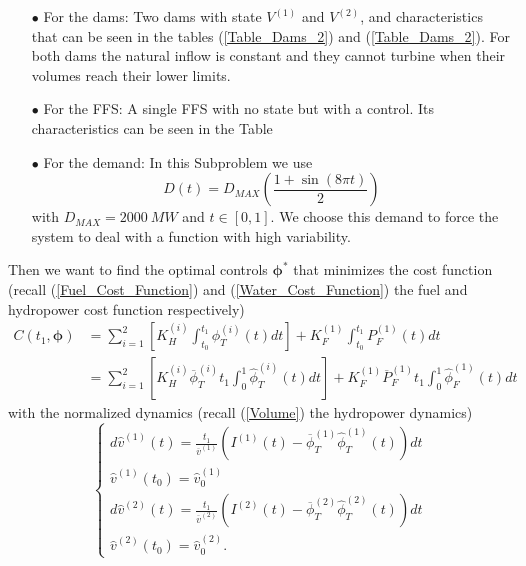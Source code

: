 \begin{enumerate}

\item[$\bullet$] For the dams: Two dams with state $V^{(1)}$ and $V^{(2)}$, and characteristics  that can be seen in the tables (\ref{Table_Dams_2}) and (\ref{Table_Dams_2}). For both dams the natural inflow is constant and they cannot turbine when their volumes reach their lower limits.

\item[$\bullet$] For the FFS: A single FFS with no state but with a control. Its characteristics can be seen in the Table 

\item[$\bullet$] For the demand: In this Subproblem we use
\begin{equation}
D(t)=D_{MAX}\left(\frac{1+\sin(8\pi t)}{2}\right)
\label{Demand_SSP}
\end{equation}
with $D_{MAX}=\SI{2000}{MW}$ and $t\in[0,1]$. We choose this demand to force the system to deal with a function with high variability.

\end{enumerate}
Then we want to find the optimal controls $\bm{\phi}^*$ that minimizes the cost function (recall (\ref{Fuel_Cost_Function}) and (\ref{Water_Cost_Function}) the fuel and hydropower cost function respectively)
\begin{equation}
\begin{split}
C(t_1,\bm{\phi})&=\sum_{i=1}^2\left[K_H^{(i)}\int_{t_0}^{t_1}\phi_T^{(i)}(t)dt\right]+K_F^{(1)}\int_{t_0}^{t_1}P_F^{(1)}(t)dt\\
&=\sum_{i=1}^2\left[K_H^{(i)}\overline{\phi}_T^{(i)}t_1\int_{0}^{1}\hat{\phi}_T^{(i)}(t)dt\right]+K_F^{(1)}\overline{P}_F^{(1)}t_1\int_{0}^{1}\hat{\phi}_F^{(1)}(t)dt
\end{split}
\end{equation}
with the normalized dynamics (recall (\ref{Volume}) the hydropower dynamics)
\begin{equation}
\begin{cases}
d\hat{v}^{(1)}(t)=\frac{t_1}{\overline{v}^{(1)}}\left(I^{(1)}(t)-\overline{\phi}_T^{(1)}\hat{\phi}_T^{(1)}(t)\right)dt\\
\hat{v}^{(1)}(t_0)=\hat{v}_0^{(1)}\\
d\hat{v}^{(2)}(t)=\frac{t_1}{\overline{v}^{(2)}}\left(I^{(2)}(t)-\overline{\phi}_T^{(2)}\hat{\phi}_T^{(2)}(t)\right)dt\\
\hat{v}^{(2)}(t_0)=\hat{v}_0^{(2)}.
\end{cases}
\end{equation}
